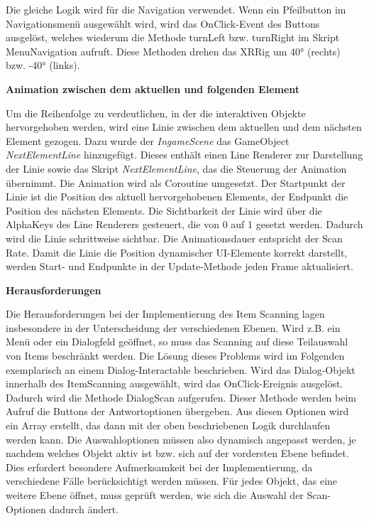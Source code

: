 Die gleiche Logik wird für die Navigation verwendet. Wenn ein Pfeilbutton im Navigationsmenü ausgewählt wird, wird das OnClick-Event des Buttons ausgelöst, welches wiederum die Methode turnLeft bzw. turnRight im Skript MenuNavigation aufruft. Diese Methoden drehen das XRRig um 40° (rechts) bzw. -40° (links).

\textbf{Animation zwischen dem aktuellen und folgenden Element}

Um die Reihenfolge zu verdeutlichen, in der die interaktiven Objekte hervorgehoben werden, wird eine Linie zwischen dem aktuellen und dem nächsten Element gezogen. Dazu wurde der \textit{IngameScene} das GameObject \textit{NextElementLine} hinzugefügt. Dieses enthält einen Line Renderer zur Darstellung der Linie sowie das Skript \textit{NextElementLine}, das die Steuerung der Animation übernimmt.
Die Animation wird als Coroutine umgesetzt. Der Startpunkt der Linie ist die Position des aktuell hervorgehobenen Elements, der Endpunkt die Position des nächsten Elements. Die Sichtbarkeit der Linie wird über die AlphaKeys des Line Renderers gesteuert, die von 0 auf 1 gesetzt werden. Dadurch wird die Linie schrittweise sichtbar. Die Animationsdauer entspricht der Scan Rate. Damit die Linie die Position dynamischer UI-Elemente korrekt darstellt, werden Start- und Endpunkte in der Update-Methode jeden Frame aktualisiert.

\textbf{Herausforderungen}

Die Herausforderungen bei der Implementierung des Item Scanning lagen insbesondere in der Unterscheidung der verschiedenen Ebenen. Wird z.B. ein Menü oder ein Dialogfeld geöffnet, so muss das Scanning auf diese Teilauswahl von Items beschränkt werden. Die Lösung dieses Problems wird im Folgenden exemplarisch an einem Dialog-Interactable beschrieben. 
Wird das Dialog-Objekt innerhalb des ItemScanning ausgewählt, wird das OnClick-Ereignis ausgelöst. Dadurch wird die Methode DialogScan aufgerufen. Dieser Methode werden beim Aufruf die Buttons der Antwortoptionen übergeben. Aus diesen Optionen wird ein Array erstellt, das dann mit der oben beschriebenen Logik durchlaufen werden kann. Die Auswahloptionen müssen also dynamisch angepasst werden, je nachdem welches Objekt aktiv ist bzw. sich auf der vordersten Ebene befindet. Dies erfordert besondere Aufmerksamkeit bei der Implementierung, da verschiedene Fälle berücksichtigt werden müssen. Für jedes Objekt, das eine weitere Ebene öffnet, muss geprüft werden, wie sich die Auswahl der Scan-Optionen dadurch ändert. 

